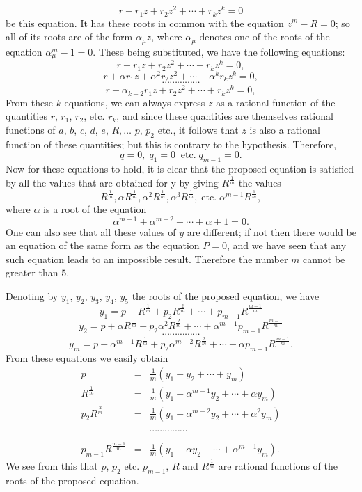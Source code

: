 \documentclass[12pt]{article}
\begin{document}
\[ r + r_1 z + r_2 z^2 + \cdots + r_k z^k = 0 \]
be this equation.  It has these roots in common with the equation $z^m-R= 0$; so all of its roots are of the form $\alpha_\mu z$, where $\alpha_\mu$ denotes one of the roots of the equation $\alpha_\mu^m -1 = 0$.  These being substituted, we have the following equations:
\[ r+ r_1 z + r_2 z^2 + \cdots + r_k z^k = 0,\]
\[ r+ \alpha r_1 z + \alpha^2 r_2 z^2 + \cdots + \alpha^k r_k z^k = 0,\]
\[ \cdots \cdots \cdots \cdots \cdots \]
\[ r+ \alpha_{k-2}r_1 z + r_2 z^2 + \cdots + r_k z^k = 0,\]
From these $k$ equations, we can always express $z$ as a rational function of the quantities $r$, $r_1$, $r_2$, etc. $r_k$, and since these quantities are themselves rational functions of $a$, $b$, $c$, $d$, $e$, $R, \dots$ $p$, $p_2$ etc., it follows that $z$ is also a rational function of these quantities; but this is contrary to the hypothesis.  Therefore,
\[ q = 0, \; q_1 = 0 \; \; \mathrm{etc.} \; q_{m-1} = 0 .\]
Now for these equations to hold, it is clear that the proposed equation is satisfied by all the values that are obtained for y by giving $R^{\frac{1}{m}}$ the values 
\[ R^{\frac{1}{m}}, \alpha R^{\frac{1}{m}},\alpha^2 R^{\frac{1}{m}},\alpha^3 R^{\frac{1}{m}}, \; \mathrm{etc.} \; \alpha^{m-1} R^{\frac{1}{m}} , \]
where $\alpha$ is a root of the equation
\[ \alpha^{m-1} + \alpha^{m-2} + \cdots + \alpha + 1 = 0 .\]
One can also see that all these values of $y$ are different; if not then there would be an equation of the same form as the equation $P=0$, and we have seen that any such equation leads to an impossible result.  Therefore the number $m$ cannot be greater than $5$.  

Denoting by $y_1$, $y_2$, $y_3$, $y_4$, $y_5$ the roots of the proposed equation, we have
\[ y_1 = p + R^{\frac{1}{m}} + p_2 R^{\frac{2}{m}} + \cdots + p_{m-1}R^{\frac{m-1}{m}} \]
\[ y_2 = p + \alpha R^{\frac{1}{m}} + p_2 \alpha^2 R^{\frac{2}{m}} + \cdots + \alpha^{m-1} p_{m-1}R^{\frac{m-1}{m}}\]
\[ \cdots \cdots \cdots \cdots \cdots \]
\[ y_m = p + \alpha^{m-1} R^{\frac{1}{m}} + p_2 \alpha^{m-2} R^{\frac{2}{m}} + \cdots + \alpha p_{m-1}R^{\frac{m-1}{m}} . \]
From these equations we easily obtain
\begin{eqnarray*} p &=& \frac{1}{m}\left(y_1 +y_2 + \cdots + y_m\right) \\
 R^{\frac{1}{m}} &=& \frac{1}{m}\left(y_1 + \alpha^{m-1}y_2 + \cdots + \alpha y_m\right) \\
 p_2R^{\frac{2}{m}} &=& \frac{1}{m} \left( y_1 + \alpha^{m-2} y_2 + \cdots + \alpha^2 y_m \right) \\
  && \\
   &&\cdots \cdots \cdots \cdots \cdots \\ 
   && \\   
   p_{m-1}R^{\frac{m-1}{m}} &=& \frac{1}{m} \left(y_1 + \alpha y_2 + \cdots + \alpha^{m-1} y_m \right).\end{eqnarray*} 
We see from this that $p$, $p_2$ etc. $p_{m-1}$, $R$ and $R^{\frac{1}{m}}$ are rational functions of the roots of the proposed equation. 
\end{document}
